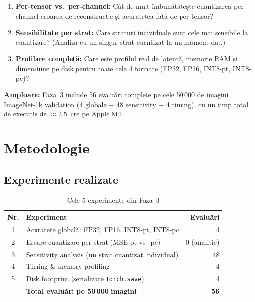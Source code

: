 \documentclass[12pt,a4paper]{article}
\begin{document}
\begin{enumerate}
  \item \textbf{Per-tensor vs.\ per-channel:} Cât de mult îmbunătățește
    cuantizarea per-channel eroarea de reconstrucție și acuratețea față
    de per-tensor?
  \item \textbf{Sensibilitate per strat:} Care straturi individuale sunt
    cele mai sensibile la cuantizare? (Analiza cu un singur strat cuantizat
    la un moment dat.)
  \item \textbf{Profilare completă:} Care este profilul real de latență,
    memorie RAM și dimensiune pe disk pentru toate cele 4 formate
    (FP32, FP16, INT8-pt, INT8-pc)?
\end{enumerate}

\textbf{Amploare:} Faza~3 include 56 evaluări complete pe cele 50\,000 de
imagini ImageNet-1k validation (4 globale + 48 sensitivity + 4 timing),
cu un timp total de execuție de $\approx 2.5$~ore pe Apple M4.

\section{Metodologie}

\subsection{Experimente realizate}

\begin{table}[H]
  \centering
  \caption{Cele 5 experimente din Faza~3}
  \begin{tabular}{clr}
    \toprule
    \textbf{Nr.} & \textbf{Experiment} & \textbf{Evaluări} \\
    \midrule
    1 & Acuratețe globală: FP32, FP16, INT8-pt, INT8-pc & 4 \\
    2 & Eroare cuantizare per strat (MSE pt vs.\ pc) & 0 (analitic) \\
    3 & Sensitivity analysis (un strat cuantizat individual) & 48 \\
    4 & Timing \& memory profiling & 4 \\
    5 & Disk footprint (serializare \texttt{torch.save}) & 4 \\
    \midrule
    & \textbf{Total evaluări pe 50\,000 imagini} & \textbf{56} \\
    \bottomrule
  \end{tabular}
  \label{tab:experiments}
\end{table}
\end{document}
